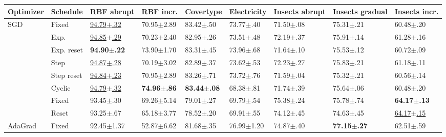 \begin{tabular}{lllllllll}
    \toprule
    Optimizer                & Schedule   & RBF abrupt                 & RBF incr.               & Covertype               & Electricity             & Insects abrupt  & Insects gradual           & Insects incr.             \\
    \midrule
    \multirow[c]{8}{*}{SGD}  & Fixed      & \underline{94.79$\pm$.32}  & 70.95$\pm$2.89          & 83.42$\pm$.50           & 73.77$\pm$.40           & 71.50$\pm$.08   & 75.31$\pm$.21             & 60.48$\pm$.20             \\
                             & Exp.       & \underline {94.85$\pm$.29} & 70.23$\pm$2.40          & 82.95$\pm$.26           & 73.51$\pm$.48           & 72.19$\pm$.37   & 75.91$\pm$.14             & 61.28$\pm$.16             \\
                             & Exp. reset & \bfseries 94.90$\pm$.22    & 73.90$\pm$1.70          & 83.31$\pm$.45           & 73.96$\pm$.68           & 71.64$\pm$.10   & 75.53$\pm$.12             & 60.72$\pm$.09             \\
                             & Step       & \underline{94.87$\pm$.28}  & 70.19$\pm$3.02          & 82.89$\pm$.37           & 73.62$\pm$.53           & 72.23$\pm$.27   & 75.83$\pm$.21             & 61.18$\pm$.11             \\
                             & Step reset & \underline{94.84$\pm$.23}  & 70.95$\pm$2.89          & 83.26$\pm$.71           & 73.72$\pm$.76           & 71.59$\pm$.04   & 75.32$\pm$.21             & 60.56$\pm$.14             \\
                             & Cyclic     & \underline{94.79$\pm$.32}  & \bfseries 74.96$\pm$.86 & \bfseries 83.44$\pm$.08 & 68.38$\pm$.81           & 71.74$\pm$.39   & 75.64$\pm$.06             & 60.48$\pm$.20             \\
    \multirow[c]{8}{*}{Adam} & Fixed      & 93.45$\pm$.30              & 69.26$\pm$5.14          & 79.01$\pm$.27           & 69.79$\pm$.54           & 75.38$\pm$.24   & 75.78$\pm$.74             & \bfseries 64.17$\pm$.13   \\
                             & Reset      & 93.25$\pm$.67              & 65.18$\pm$3.77          & 78.52$\pm$.20           & 69.91$\pm$.55           & 74.12$\pm$.45   & 74.63$\pm$.45             & \underline{64.17$\pm$.15} \\
    AdaGrad                  & Fixed      & 92.45$\pm$1.37             & 52.87$\pm$6.62          & 81.68$\pm$.35           & 76.99$\pm$1.20          & 74.87$\pm$.40   & \bfseries 77.15$\pm$.27   & 62.51$\pm$.59             \\

\end{tabular}
